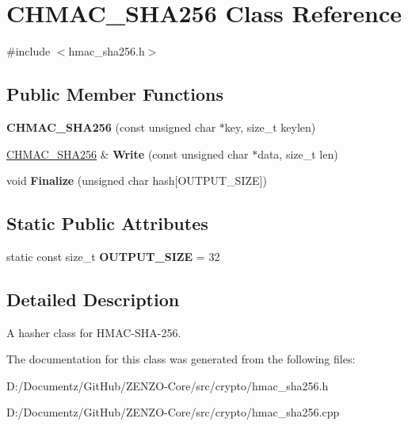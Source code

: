 \hypertarget{class_c_h_m_a_c___s_h_a256}{}\section{C\+H\+M\+A\+C\+\_\+\+S\+H\+A256 Class Reference}
\label{class_c_h_m_a_c___s_h_a256}


{\ttfamily \#include $<$hmac\+\_\+sha256.\+h$>$}

\subsection*{Public Member Functions}
\begin{DoxyCompactItemize}
\item 
\mbox{\label{class_c_h_m_a_c___s_h_a256_a63236821773ad9edb3fba4623eef39b2}} 
{\bfseries C\+H\+M\+A\+C\+\_\+\+S\+H\+A256} (const unsigned char $\ast$key, size\+\_\+t keylen)
\item 
\mbox{\label{class_c_h_m_a_c___s_h_a256_a24ac9cf00e60d8028ab79df4aed984ff}} 
\mbox{\hyperlink{class_c_h_m_a_c___s_h_a256}{C\+H\+M\+A\+C\+\_\+\+S\+H\+A256}} \& {\bfseries Write} (const unsigned char $\ast$data, size\+\_\+t len)
\item 
\mbox{\label{class_c_h_m_a_c___s_h_a256_a1cc600fd485b79dc52e11b12635c6dbe}} 
void {\bfseries Finalize} (unsigned char hash\mbox{[}O\+U\+T\+P\+U\+T\+\_\+\+S\+I\+ZE\mbox{]})
\end{DoxyCompactItemize}
\subsection*{Static Public Attributes}
\begin{DoxyCompactItemize}
\item 
\mbox{\label{class_c_h_m_a_c___s_h_a256_a6c94951e3698ec9bd4af95a1b9f9a2bb}} 
static const size\+\_\+t {\bfseries O\+U\+T\+P\+U\+T\+\_\+\+S\+I\+ZE} = 32
\end{DoxyCompactItemize}


\subsection{Detailed Description}
A hasher class for H\+M\+A\+C-\/\+S\+H\+A-\/256. 

The documentation for this class was generated from the following files\+:\begin{DoxyCompactItemize}
\item 
D\+:/\+Documentz/\+Git\+Hub/\+Z\+E\+N\+Z\+O-\/\+Core/src/crypto/hmac\+\_\+sha256.\+h\item 
D\+:/\+Documentz/\+Git\+Hub/\+Z\+E\+N\+Z\+O-\/\+Core/src/crypto/hmac\+\_\+sha256.\+cpp\end{DoxyCompactItemize}
